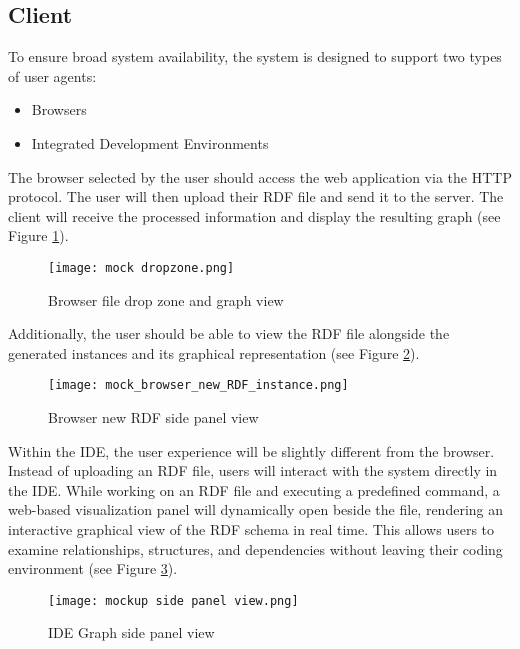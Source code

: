\subsection{Client\label{sec:reqsuba}}
To ensure broad system availability, the system is designed to support two types of user agents:
\begin{itemize}
    \item Browsers
    \item Integrated Development Environments 
\end{itemize}
The browser selected by the user should access the web application via the HTTP protocol.
The user will then upload their RDF file and send it to the server.
The client will receive the processed information and display the resulting graph (see Figure \ref{fig:BrowserGraphView}).

\begin{figure}[htb]
    \centering
    \texttt{[image: mock dropzone.png]}\\
    \caption{Browser file drop zone and graph view}\label{fig:BrowserGraphView}
\end{figure}

Additionally, the user should be able to view the RDF file alongside the generated instances and its graphical representation (see Figure \ref{fig:BrowserRDFReader}).

\begin{figure}[htb]
    \centering
    \texttt{[image: mock\_browser\_new\_RDF\_instance.png]}\\
    \caption{Browser new RDF side panel view}\label{fig:BrowserRDFReader}
\end{figure}

Within the IDE, the user experience will be slightly different from the browser. Instead of uploading an RDF file, users will interact with the system directly in the IDE. While working on an RDF file and executing a predefined command, a web-based visualization panel will dynamically open beside the file, rendering an interactive graphical view of the RDF schema in real time. This allows users to examine relationships, structures, and dependencies without leaving their coding environment (see Figure \ref{fig:IDEGraphView}). 

\begin{figure}[H]
    \centering
    \texttt{[image: mockup side panel view.png]}\\
    \caption{IDE Graph side panel view}\label{fig:IDEGraphView}
\end{figure}

